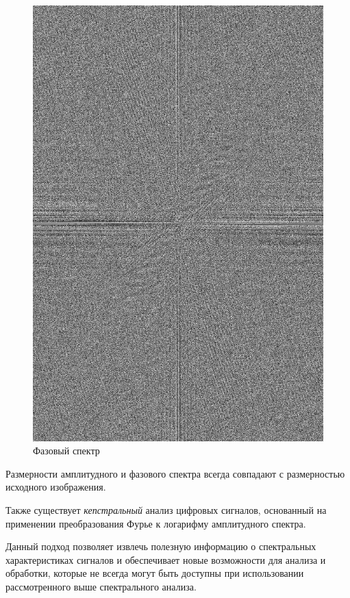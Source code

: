 \begin{figure}[!htb]
\begin{minipage}{0.5\textwidth}
		\includegraphics[scale=0.22]{assets/flowers_gray_angle_spectrum}
		\caption{Фазовый спектр}\label{angle_flowers}
	\end{minipage}
\end{figure}

Размерности амплитудного и фазового спектра всегда совпадают с размерностью исходного изображения.

Также существует \textit{кепстральный} анализ цифровых сигналов, основанный на применении преобразования Фурье к логарифму амплитудного спектра. 

Данный подход позволяет извлечь полезную информацию о спектральных характеристиках сигналов и обеспечивает новые возможности для анализа и обработки, которые не всегда могут быть доступны при использовании рассмотренного выше спектрального анализа. 

